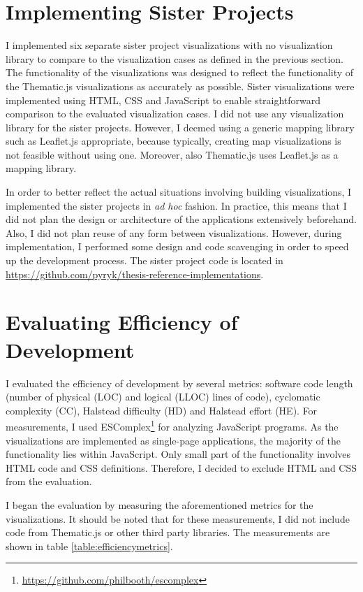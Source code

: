 \section{Implementing Sister Projects}

I implemented six separate sister project visualizations with no visualization library to compare to the visualization cases as defined in the previous section. The functionality of the visualizations was designed to reflect the functionality of the Thematic.js visualizations as accurately as possible. Sister visualizations were implemented using HTML, CSS and JavaScript to enable straightforward comparison to the evaluated visualization cases. I did not use any visualization library for the sister projects. However, I deemed using a generic mapping library such as Leaflet.js appropriate, because typically, creating map visualizations is not feasible without using one. Moreover, also Thematic.js uses Leaflet.js as a mapping library.

In order to better reflect the actual situations involving building visualizations, I implemented the sister projects in \emph{ad hoc} fashion. In practice, this means that I did not plan the design or architecture of the applications extensively beforehand. Also, I did not plan reuse of any form between visualizations. However, during implementation, I performed some design and code scavenging in order to speed up the development process. The sister project code is located in \url{https://github.com/pyryk/thesis-reference-implementations}.

\section{Evaluating Efficiency of Development}
\label{section:evaluatingefficiency}

I evaluated the efficiency of development by several metrics: software code length (number of physical (LOC) and logical (LLOC) lines of code), cyclomatic complexity (CC), Halstead difficulty (HD) and Halstead effort (HE). For measurements, I used ESComplex\footnote{\url{https://github.com/philbooth/escomplex}} for analyzing JavaScript programs. As the visualizations are implemented as single-page applications, the majority of the functionality lies within JavaScript. Only small part of the functionality involves HTML code and CSS definitions. Therefore, I decided to exclude HTML and CSS from the evaluation.

I began the evaluation by measuring the aforementioned metrics for the visualizations. It should be noted that for these measurements, I did not include code from Thematic.js or other third party libraries. The measurements are shown in table \ref{table:efficiencymetrics}.

